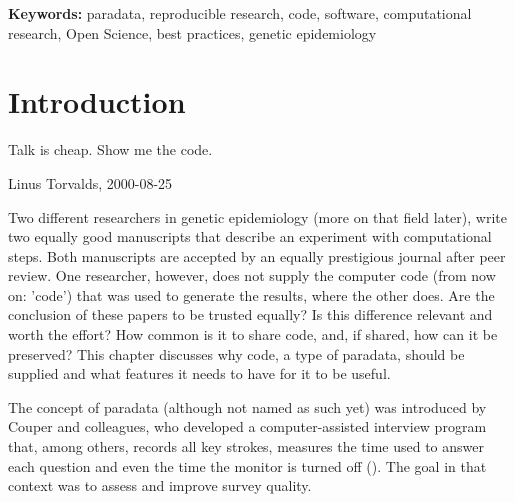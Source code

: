 
{\bf Keywords:} paradata, reproducible research, code, software,
computational research, Open Science, best practices,
genetic epidemiology

\section{Introduction}

\epigraph{
  Talk is cheap. Show me the code.
}{
  Linus Torvalds, 2000-08-25
}


Two different researchers in genetic epidemiology (more on that field later), 
write two equally good manuscripts
that describe an experiment with computational steps.
Both manuscripts are accepted by an equally prestigious journal after peer review. 
One researcher, however, does not supply the
computer code (from now on: 'code') that was used to generate the results,
where the other does.
Are the conclusion of these papers to be trusted equally?
Is this difference relevant and worth the effort?
How common is it to share code, and, if shared, how can it be preserved?
This chapter discusses why code, a type of paradata, 
should be supplied and what features it needs to have
for it to be useful.


The concept of paradata (although not named as such yet) 
was introduced by Couper and colleagues,
who developed a computer-assisted interview program
that, among others, records all key strokes,
measures the time used to answer each question 
and even the time the monitor is turned off (\cite{couper1998measuring}).
The goal in that context was to assess and improve survey quality.

